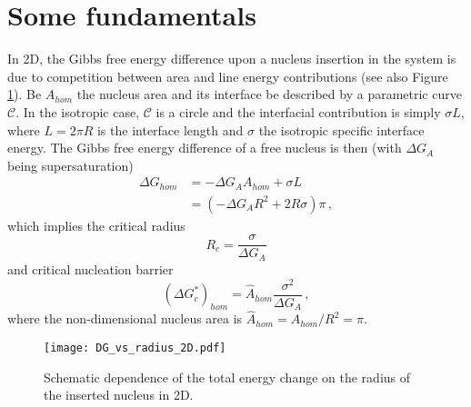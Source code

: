 \section{Some fundamentals}
In 2D, the Gibbs free energy difference upon a nucleus insertion in the system is due to competition between area and line energy contributions (see also Figure \ref{fig_DG_2D_sketch}). Be $A_{hom}$ the nucleus area and its interface be described by a parametric curve $\mathcal{C}$. In the isotropic case, $\mathcal{C}$ is a circle and the interfacial contribution is simply $\sigma L$, where $L=2\pi R$ is the interface length and $\sigma$ the isotropic specific interface energy. The Gibbs free energy difference of a free nucleus is then (with $\Delta G_A$ being supersaturation)
\begin{align}
	\Delta G_{hom} &= -\Delta G_A A_{hom} + \sigma L \\
	\label{eq_DG_hom_iso}	&= (-\Delta G_A R^2 + 2R\sigma)\pi \,,
\end{align}
which implies the critical radius
\begin{equation} \label{eq_crit_radius_2D}
	R_c = \frac{\sigma}{\Delta G_A}
\end{equation}
and critical nucleation barrier
\begin{equation} \label{eq_nucl_barr_hom_2D}
	(\Delta G_c^*)_{hom} = \hat{A}_{hom}\frac{\sigma^2}{\Delta G_A}\,,
\end{equation}
where the non-dimensional nucleus area is $\hat{A}_{hom}=A_{hom}/R^2=\pi$.

\begin{figure}
	\centering
%			
%			
%			
	\texttt{[image: DG\_vs\_radius\_2D.pdf]}
	\caption{Schematic dependence of the total energy change on the radius of the inserted nucleus in 2D.}
	\label{fig_DG_2D_sketch}
\end{figure}

